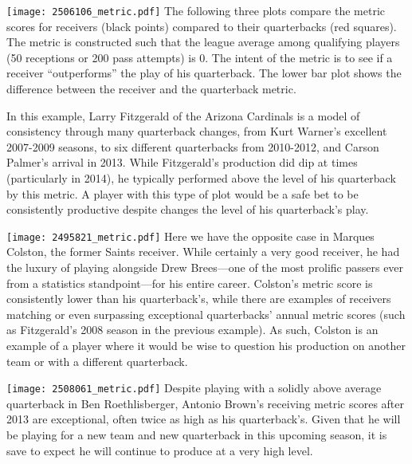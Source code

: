 \documentclass{article}
\begin{document}
\texttt{[image: 2506106\_metric.pdf]}
The following three plots compare the metric scores for receivers (black points) compared to their quarterbacks (red squares).  
The metric is constructed such that the league average among qualifying players (50 receptions or 200 pass attempts) is 0.
The intent of the metric is to see if a receiver ``outperforms'' the play of his quarterback.
The lower bar plot shows the difference between the receiver and the quarterback metric.

In this example, Larry Fitzgerald of the Arizona Cardinals is a model of consistency through many quarterback changes, from Kurt Warner's excellent 2007-2009 seasons, to six different quarterbacks from 2010-2012, and Carson Palmer's arrival in 2013.
While Fitzgerald's production did dip at times (particularly in 2014), he typically performed above the level of his quarterback by this metric.
A player with this type of plot would be a safe bet to be consistently productive despite changes the level of his quarterback's play.

\newpage
\texttt{[image: 2495821\_metric.pdf]}
Here we have the opposite case in Marques Colston, the former Saints receiver.
While certainly a very good receiver, he had the luxury of playing alongside Drew Brees---one of the most prolific passers ever from a statistics standpoint---for his entire career.
Colston's metric score is consistently lower than his quarterback's, while there are examples of receivers matching or even surpassing exceptional quarterbacks' annual metric scores (such as Fitzgerald's 2008 season in the previous example).
As such, Colston is an example of a player where it would be wise to question his production on another team or with a different quarterback.

\newpage
\texttt{[image: 2508061\_metric.pdf]}
Despite playing with a solidly above average quarterback in Ben Roethlisberger, Antonio Brown's receiving metric scores after 2013 are exceptional, often twice as high as his quarterback's.
Given that he will be playing for a new team and new quarterback in this upcoming season, it is save to expect he will continue to produce at a very high level.
\end{document}
